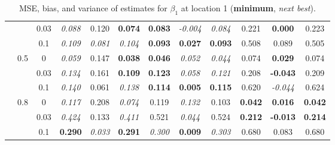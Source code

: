\documentclass[authoryear, review, 11pt]{elsarticle}
\begin{document}
\begin{table}[ht]
\begin{center}
\begin{tabular}{ccc | ccc | ccc | ccc }
 &  & 0.03 &   \emph{0.088} & 0.120 & \textbf{0.074} & \textbf{0.083} & \emph{-0.004} & \emph{0.084} & 0.221 & \textbf{0.000} & 0.223 \\ 
 &  & 0.1 &   \emph{0.109} & \emph{0.081} & \emph{0.104} & \textbf{0.093} & \textbf{0.027} & \textbf{0.093} & 0.508 & 0.089 & 0.505 \\ \cline{2-12}
 & \multirow{3}{*}{0.5} & 0 &   \emph{0.059} & 0.147 & \textbf{0.038} & \textbf{0.046} & \emph{0.052} & \emph{0.044} & 0.074 & \textbf{0.029} & 0.074 \\ 
 &  & 0.03 &   \emph{0.134} & 0.161 & \textbf{0.109} & \textbf{0.123} & \emph{0.058} & \emph{0.121} & 0.208 & \textbf{-0.043} & 0.209 \\ 
 &  & 0.1 &   \emph{0.140} & 0.061 & \emph{0.138} & \textbf{0.114} & \textbf{0.005} & \textbf{0.115} & 0.620 & \emph{-0.044} & 0.624 \\ \cline{2-12}
 & \multirow{3}{*}{0.8} & 0 &   \emph{0.117} & 0.208 & \emph{0.074} & 0.119 & \emph{0.132} & 0.103 & \textbf{0.042} & \textbf{0.016} & \textbf{0.042} \\ 
 &  & 0.03 &   \emph{0.424} & 0.133 & \emph{0.411} & 0.521 & \emph{0.044} & 0.524 & \textbf{0.212} & \textbf{-0.013} & \textbf{0.214} \\ 
 &  & 0.1 &   \textbf{0.290} & \emph{0.033} & \textbf{0.291} & \emph{0.300} & \textbf{0.009} & \emph{0.303} & 0.680 & 0.083 & 0.680 \\ 
  \end{tabular}
\caption{MSE, bias, and variance of estimates for $\beta_1$ at location 1 (\textbf{minimum}, \emph{next best}).}
\end{center}
\end{table}
\end{document}
